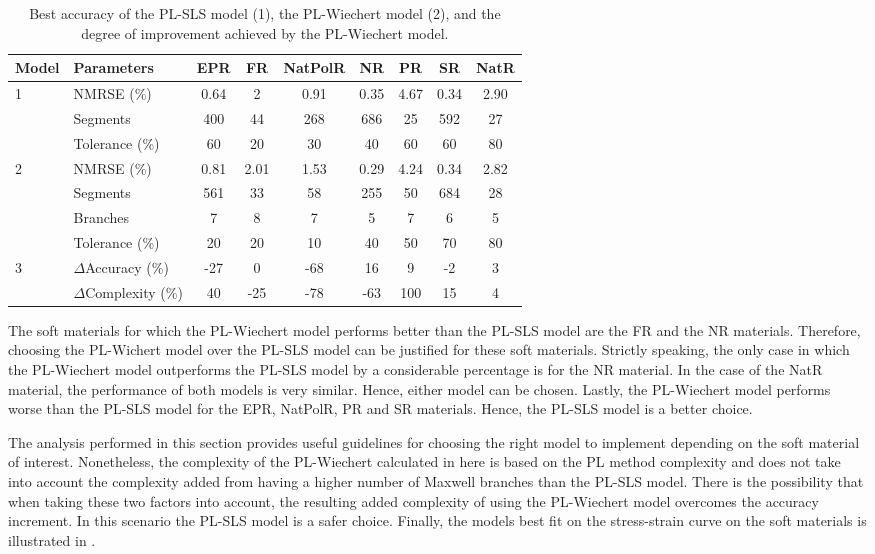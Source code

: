 \begin{table*}[htbp!]
	\centering
	\caption{Best accuracy of the PL-SLS model (1), the PL-Wiechert model (2), and the degree of improvement achieved by the PL-Wiechert model.}
	\label{tbl:PLModelsPerformance}
	\begin{tabular}{llccccccc} \toprule
		Model 					& Parameters 		& EPR	& FR & NatPolR & NR & PR & SR & NatR \\
		\hline
		\multirow{3}{*}{1}  & NMRSE (\%)		& 0.64	& 2 & 0.91 & 0.35 & 4.67 & 0.34 & 2.90 \\
								& Segments		& 400	& 44 & 268 & 686 & 25 & 592 & 27 \\
								& Tolerance (\%)	& 60	& 20 & 30 & 40 & 60 & 60 & 80 \\
		\hline 
		\multirow{4}{*}{2}  & NMRSE (\%)	& 0.81	& 2.01 & 1.53 & 0.29 & 4.24 & 0.34 & 2.82 \\
								& Segments		& 561	& 33 & 58 & 255 & 50 & 684 & 28 \\
								& Branches		& 7 	& 8 & 7 & 5 & 7 & 6 & 5 \\
								& Tolerance	(\%)	& 20	& 20 & 10 & 40 & 50 & 70 & 80 \\
		\hline
		\multirow{2}{*}{3}		& $\Delta$Accuracy (\%)	& -27	& 0 & -68 & 16 & 9 & -2 & 3 \\
								& $\Delta$Complexity (\%)	& 40	& -25 & -78 & -63 & 100 & 15 & 4 \\
		\bottomrule
	\end{tabular}
\end{table*}

The soft materials for which the PL-Wiechert model performs better than the PL-SLS model are the FR and the NR materials. Therefore, choosing the PL-Wichert model over the PL-SLS model can be justified for these soft materials. Strictly speaking, the only case in which the PL-Wiechert model outperforms the PL-SLS model by a considerable percentage is for the NR material. In the case of the NatR material, the performance of both models is very similar. Hence, either model can be chosen. Lastly, the PL-Wiechert model performs worse than the PL-SLS model for the EPR, NatPolR, PR and SR materials. Hence, the PL-SLS model is a better choice.

The analysis performed in this section provides useful guidelines for choosing the right model to implement depending on the soft material of interest. Nonetheless, the complexity of the PL-Wiechert calculated in here is based on the PL method complexity and does not take into account the complexity added from having a higher number of Maxwell branches than the PL-SLS model. There is the possibility that when taking these two factors into account, the resulting added complexity of using the PL-Wiechert model overcomes the accuracy increment. In this scenario the PL-SLS model is a safer choice. Finally, the models best fit on the stress-strain curve on the soft materials is illustrated in .

